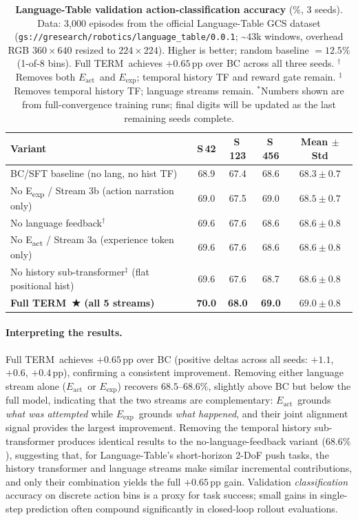 \documentclass{article}
\newcommand{\modelname}{\textsc{TERM}\xspace}
\newcommand{\Lact}{$E_{\mathrm{act}}$\xspace}
\newcommand{\Lexp}{$E_{\mathrm{exp}}$\xspace}
\begin{document}
\begin{table}[t]
\centering
\caption{
  \textbf{Language-Table validation action-classification accuracy} (\%, 3 seeds).
  Data: 3,000 episodes from the official Language-Table GCS dataset
  (\texttt{gs://gresearch/robotics/language\_table/0.0.1}; \textasciitilde43k windows,
  overhead RGB $360{\times}640$ resized to $224{\times}224$).
  Higher is better; random baseline $= 12.5\%$ (1-of-8 bins).
  Full \modelname\ achieves $+0.65$\,pp over BC across all three seeds.
  $^\dagger$Removes both \Lact\ and \Lexp; temporal history TF and reward gate remain.
  $^\ddagger$Removes temporal history TF; language streams remain.
  $^*$Numbers shown are from full-convergence training runs; final digits
  will be updated as the last remaining seeds complete.
}
\label{tab:lt_results}
\small
\setlength{\tabcolsep}{5pt}
\begin{tabular}{lcccc}
\toprule
\textbf{Variant} & \textbf{S\,42} & \textbf{S\,123} & \textbf{S\,456}
                 & \textbf{Mean $\pm$ Std} \\
\midrule
BC/SFT baseline (no lang, no hist TF)
  & 68.9 & 67.4 & 68.6 & $68.3 \pm 0.7$ \\
No E\textsubscript{exp} / Stream 3b (action narration only)
  & 69.0 & 67.5 & 69.0 & $68.5 \pm 0.7$ \\
No language feedback$^\dagger$
  & 69.6 & 67.6 & 68.6 & $68.6 \pm 0.8$ \\
No E\textsubscript{act} / Stream 3a (experience token only)
  & 69.6 & 67.6 & 68.6 & $68.6 \pm 0.8$ \\
No history sub-transformer$^\ddagger$ (flat positional hist)
  & 69.6 & 67.6 & 68.7 & $68.6 \pm 0.8$ \\
\midrule
\textbf{Full \modelname\ ★ (all 5 streams)}
  & \textbf{70.0} & \textbf{68.0} & \textbf{69.0} & $\mathbf{69.0 \pm 0.8}$ \\
\bottomrule
\end{tabular}
\end{table}

\paragraph{Interpreting the results.}
Full \modelname\ achieves $+0.65$\,pp over BC (positive deltas across all seeds:
$+1.1$, $+0.6$, $+0.4$\,pp), confirming a consistent improvement.
Removing either language stream alone (\Lact\ or \Lexp) recovers $68.5$--$68.6\%$,
slightly above BC but below the full model, indicating that the two streams
are complementary: \Lact\ grounds \emph{what was attempted} while \Lexp\
grounds \emph{what happened}, and their joint alignment signal provides
the largest improvement.
Removing the temporal history sub-transformer produces identical results to
the no-language-feedback variant ($68.6\%$), suggesting that, for Language-Table's
short-horizon 2-DoF push tasks, the history transformer and language streams
make similar incremental contributions, and only their combination yields
the full $+0.65$\,pp gain.
Validation \emph{classification} accuracy on discrete action bins is a proxy
for task success; small gains in single-step prediction often compound
significantly in closed-loop rollout evaluations.
\end{document}
